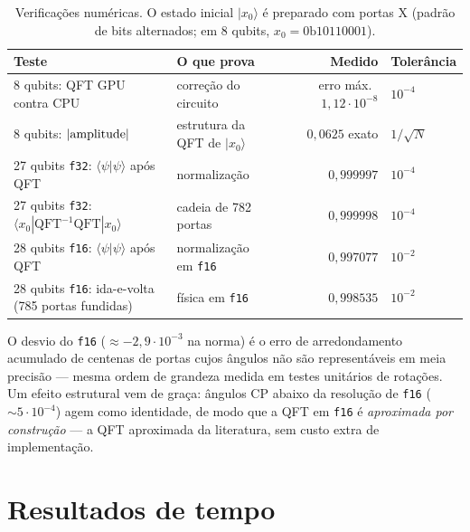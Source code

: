 \documentclass[11pt,a4paper]{article}
\begin{document}
\begin{table}[h]
\centering
\begin{tabular}{llrl}
\toprule
Teste & O que prova & Medido & Tolerância \\
\midrule
8 qubits: QFT GPU contra CPU & correção do circuito & erro máx.\ $1{,}12\cdot10^{-8}$ & $10^{-4}$ \\
8 qubits: $|{\rm amplitude}|$ & estrutura da QFT de $|x_0\rangle$ & $0{,}0625$ exato & $1/\sqrt{N}$ \\
27 qubits \texttt{f32}: $\langle\psi|\psi\rangle$ após QFT & normalização & $0{,}999997$ & $10^{-4}$ \\
27 qubits \texttt{f32}: $\langle x_0|\mathrm{QFT}^{-1}\mathrm{QFT}|x_0\rangle$ & cadeia de 782 portas & $0{,}999998$ & $10^{-4}$ \\
28 qubits \texttt{f16}: $\langle\psi|\psi\rangle$ após QFT & normalização em \texttt{f16} & $0{,}997077$ & $10^{-2}$ \\
28 qubits \texttt{f16}: ida-e-volta (785 portas fundidas) & física em \texttt{f16} & $0{,}998535$ & $10^{-2}$ \\
\bottomrule
\end{tabular}
\caption{Verificações numéricas. O estado inicial $|x_0\rangle$ é preparado com
portas X (padrão de bits alternados; em 8 qubits, $x_0 = 0\mathrm{b}10110001$).}
\end{table}

O desvio do \texttt{f16} ($\approx -2{,}9\cdot10^{-3}$ na norma) é o erro de
arredondamento acumulado de centenas de portas cujos ângulos não são
representáveis em meia precisão --- mesma ordem de grandeza medida em testes
unitários de rotações. Um efeito estrutural vem de graça: ângulos CP abaixo da
resolução de \texttt{f16} ($\sim5\cdot10^{-4}$) agem como identidade, de modo
que a QFT em \texttt{f16} é \emph{aproximada por construção} --- a QFT
aproximada da literatura, sem custo extra de implementação.

\section{Resultados de tempo}
\end{document}
